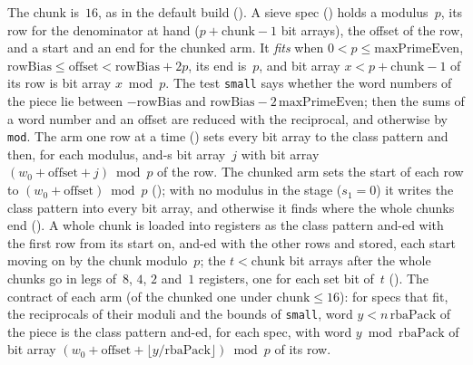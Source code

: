 \begin{definition}\label{def:firstStage}
  \leanok
  The chunk is~$16$, as in the default build (). A sieve spec
  () holds a modulus~$p$, its row for the denominator at hand
  ($p + \mathrm{chunk} - 1$ bit arrays), the offset of the row, and a start and an end for the
  chunked arm. It \emph{fits} when $0 < p \le \mathrm{maxPrimeEven}$,
  $\mathrm{rowBias} \le \mathrm{offset} < \mathrm{rowBias} + 2p$, its end is~$p$, and bit array
  $x < p + \mathrm{chunk} - 1$ of its row is bit array $x \bmod p$. The test \verb|small| says
  whether the word numbers of the piece lie between $-\mathrm{rowBias}$ and $\mathrm{rowBias} -
  2\,\mathrm{maxPrimeEven}$; then the sums of a word number and an offset are reduced with the
  reciprocal, and otherwise by \verb|mod|. The arm one row at a time ()
  sets every bit array to the class pattern and then, for each modulus, and-s bit array~$j$ with bit
  array $(w_0 + \mathrm{offset} + j) \bmod p$ of the row. The chunked arm sets the start of each
  row to $(w_0 + \mathrm{offset}) \bmod p$ (); with no modulus in the
  stage ($s_1 = 0$) it writes the class pattern into every bit array, and otherwise it finds where
  the whole chunks end (). A whole chunk is loaded into registers as the
  class pattern and-ed with the first row from its start on, and-ed with the other rows and stored,
  each start moving on by the chunk modulo~$p$; the $t < \mathrm{chunk}$ bit arrays after the whole
  chunks go in legs of~$8$, $4$, $2$ and~$1$ registers, one for each set bit of~$t$
  (). The contract of each arm (of the chunked one under
  $\mathrm{chunk} \le 16$): for specs that fit, the reciprocals of their moduli and the bounds of
  \verb|small|, word $y < n\,\mathrm{rbaPack}$ of the piece is the class pattern and-ed, for each
  spec, with word $y \bmod \mathrm{rbaPack}$ of bit array $(w_0 + \mathrm{offset} + \lfloor
  y/\mathrm{rbaPack} \rfloor) \bmod p$ of its row.
\end{definition}

